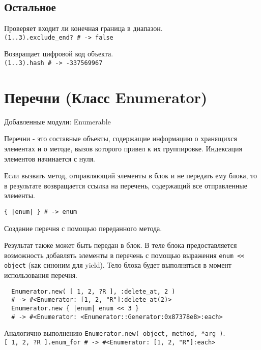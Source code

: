 \subsection*{Остальное}

\begin{methodlist}
  Проверяет входит ли конечная граница в диапазон. 
  \\\verb!(1..3).exclude_end? # -> false!

  Возвращает цифровой код объекта. 
  \\\verb!(1..3).hash # -> -337569967!
\end{methodlist}

\section{Перечни (Класс Enumerator)}

Добавленные модули: Enumerable 

Перечни - это составные объекты, содержащие информацию о хранящихся элементах и о методе, вызов которого привел к их группировке. Индексация элементов начинается с нуля. 

Если вызвать метод, отправляющий элементы в блок и не передать ему блока, то в результате возвращается ссылка на перечень, содержащий все отправленные элементы. 

\begin{methodlist}
  \verb!{ |enum| } # -> enum!

  Создание перечня с помощью переданного метода. 

  Результат также может быть передан в блок. В теле блока предоставляется возможность добавлять элементы в перечень с помощью выражения \verb!enum << object! (как синоним для yield). Тело блока будет выполняться в момент использования перечня.
  \begin{verbatim}
  Enumerator.new( [ 1, 2, ?R ], :delete_at, 2 ) 
  # -> #<Enumerator: [1, 2, "R"]:delete_at(2)> 
  Enumerator.new { |enum| enum << 3 } 
  # -> #<Enumerator: <Enumerator::Generator:0x87378e8>:each>
  \end{verbatim}

  Аналогично выполнению \verb!Enumerator.new( object, method, *arg )!. 
  \\\verb![ 1, 2, ?R ].enum_for # -> #<Enumerator: [1, 2, "R"]:each>!
\end{methodlist}

